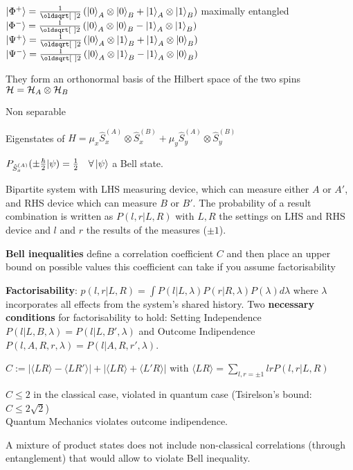 \begin{squishlist}
    \item $\ket{\Phi^+} = \frac{1}{\sqrt{2}} \left( \ket{0}_A \otimes \ket{0}_B + \ket{1}_A \otimes \ket{1}_B\right)$ \hfill maximally entangled\\
          $\ket{\Phi^-} = \frac{1}{\sqrt{2}} \left( \ket{0}_A \otimes \ket{0}_B - \ket{1}_A \otimes \ket{1}_B\right)$ \\
          $\ket{\Psi^+} = \frac{1}{\sqrt{2}} \left( \ket{0}_A \otimes \ket{1}_B + \ket{1}_A \otimes \ket{0}_B\right)$ \\
          $\ket{\Psi^-} = \frac{1}{\sqrt{2}} \left( \ket{0}_A \otimes \ket{1}_B - \ket{1}_A \otimes \ket{0}_B\right)$
    \item They form an orthonormal basis of the Hilbert space of the two spins $\mathcal{H} = \mathcal{H}_A \otimes \mathcal{H}_B$
    \item Non separable
    \item Eigenstates of $\hat{H} = \mu_x \hat{S}_x^{(A)} \otimes \hat{S}_x^{(B)} + \mu_y \hat{S}_y^{(A)} \otimes \hat{S}_y^{(B)}$
    \item $P_{\hat{S}_x^{(A)}}(\pm \frac{\hbar}{2} | \psi) = \frac{1}{2} \quad \forall \ket{\psi} $ a Bell state. 
\end{squishlist}


\begin{squishlist}
    \item Bipartite system with LHS measuring device, which can measure either $A$ or $A'$, and RHS device which can measure $B$ or $B'$.
    The probability of a result combination is written as $P(l,r|L,R)$ with $L,R$ the settings on LHS and RHS device and $l$ and $r$ the results of the measures ($\pm 1$).
    \item \textbf{Bell inequalities} define a correlation coefficient $C$ and then place an upper bound on possible values this coefficient can take if you assume factorisability
    \item \textbf{Factorisability}: $p(l,r|L,R) = \int P(l|L,\lambda) P(r|R,\lambda) P(\lambda) d\lambda$ where $\lambda$ incorporates all effects from the system's shared history.
    Two \textbf{necessary conditions} for factorisability to hold: Setting Independence $P(l|L,B,\lambda) = P(l|L,B',\lambda)$ and Outcome Indipendence $P(l,A,R,r,\lambda) = P(l|A,R,r',\lambda)$.
    \item $C:= |\langle LR \rangle - \langle LR'\rangle  | + |\langle LR\rangle + \langle L'R \rangle |$ with $\langle LR \rangle = \sum_{l,r=\pm 1}lr P(l,r|L,R)$
    \item $C \leq 2$ in the classical case, violated in quantum case (Tsirelson's bound: $C \leq 2\sqrt{2}$) \\ Quantum Mechanics violates outcome indipendence.
    \item A mixture of product states does not include non-classical correlations (through entanglement) that would allow to violate Bell inequality.
\end{squishlist}


